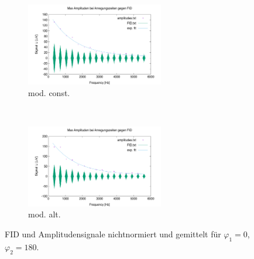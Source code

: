 \documentclass[../../main.tex]{subfiles}
\begin{document}
        \begin{figure}[H]
            \centering
            \begin{subfigure}[b]{0.4\textwidth}
                \centering
                \includegraphics[width=6cm]{Bilddateien/10/CPMG-0-180-constant-avg.png}
                \caption{mod. const.}
                \label{fig:CPMG-0-180-constant-avg}
            \end{subfigure}
            \
            \begin{subfigure}[b]{0.4\textwidth}
                \centering
                \includegraphics[width=6cm]{Bilddateien/10/CPMG-0-180-alternating-avg.png}
                \caption{mod. alt.}
                \label{fig:CPMG-0-180-alternating-avg}
            \end{subfigure}
            \caption{FID und Amplitudensignale nichtnormiert und gemittelt für $\varphi_1 = 0$, $\varphi_2 = 180$.}
            \label{fig:CPMG-0-180-avg}
        \end{figure}
\end{document}
